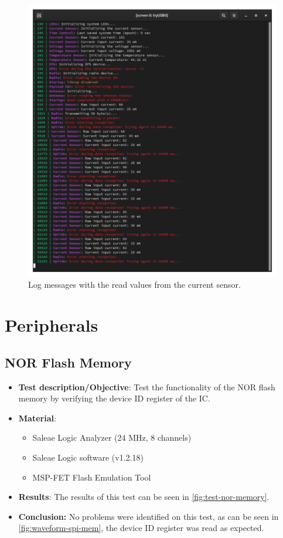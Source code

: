 \begin{figure}[!ht]
    \begin{center}
        \includegraphics[width=0.7\columnwidth]{figures/v05/log-current-sensor.png}
        \caption{Log messages with the read values from the current sensor.}
        \label{fig:log-current-sensor}
    \end{center}
\end{figure}

\section{Peripherals}

\subsection{NOR Flash Memory}

\begin{itemize}
    \item \textbf{Test description/Objective}: Test the functionality of the NOR flash memory by verifying the device ID register of the IC.
    \item \textbf{Material}:
        \begin{itemize}
            \item Saleae Logic Analyzer (24 MHz, 8 channels)
            \item Saleae Logic software (v1.2.18)
            \item MSP-FET Flash Emulation Tool
        \end{itemize}
    \item \textbf{Results}: The results of this test can be seen in \autoref{fig:test-nor-memory}.
    \item \textbf{Conclusion:} No problems were identified on this test, as can be seen in \autoref{fig:waveform-spi-mem}, the device ID register was read as expected.
\end{itemize}

